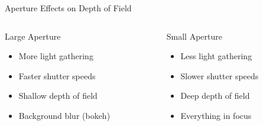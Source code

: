 \begin{frame}{Aperture Effects on Depth of Field}
  \vspace{0.5cm}
  \begin{columns}
    \begin{column}{0.5\textwidth}
      \begin{raybox}{Large Aperture}
        \begin{itemize}
          \item More light gathering
          \item Faster shutter speeds
          \item Shallow depth of field
          \item Background blur (bokeh)
        \end{itemize}
      \end{raybox}
    \end{column}
    \begin{column}{0.5\textwidth}
      \begin{raybox}{Small Aperture}
        \begin{itemize}
          \item Less light gathering
          \item Slower shutter speeds
          \item Deep depth of field
          \item Everything in focus
        \end{itemize}
      \end{raybox}
    \end{column}
  \end{columns}
\end{frame}

